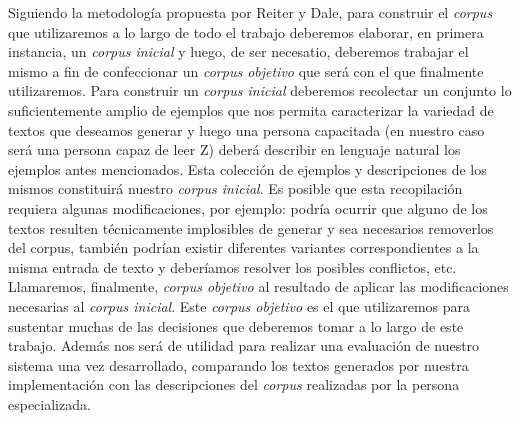 Siguiendo la metodología propuesta por Reiter y Dale, para construir el \emph{corpus} que utilizaremos a lo largo de todo el trabajo deberemos elaborar, en primera instancia, un \emph{corpus inicial} y luego, de ser necesatio, deberemos trabajar el mismo a fin de confeccionar un \emph{corpus objetivo} que será con el que finalmente utilizaremos. Para construir un \emph{corpus inicial} deberemos recolectar un conjunto lo suficientemente amplio de ejemplos que nos permita caracterizar la variedad de textos que deseamos generar y luego una persona capacitada (en nuestro caso será una persona capaz de leer Z) deberá describir en lenguaje natural los ejemplos antes mencionados. Esta colección de ejemplos y descripciones de los mismos constituirá nuestro \emph{corpus inicial}. Es posible que esta recopilación requiera algunas modificaciones, por ejemplo: podría ocurrir que alguno de los textos resulten técnicamente implosibles de generar y sea necesarios removerlos del corpus, también podrían existir diferentes variantes correspondientes a la misma entrada de texto y deberíamos resolver los posibles conflictos, etc. Llamaremos, finalmente, \emph{corpus objetivo} al resultado de aplicar las modificaciones necesarias al \emph{corpus inicial}. Este \emph{corpus objetivo} es el que utilizaremos para sustentar muchas de las decisiones que deberemos tomar a lo largo de este trabajo. Además nos será de utilidad para realizar una evaluación de nuestro sistema una vez desarrollado, comparando los textos generados por nuestra implementación con las descripciones del \emph{corpus} realizadas por la persona especializada.


